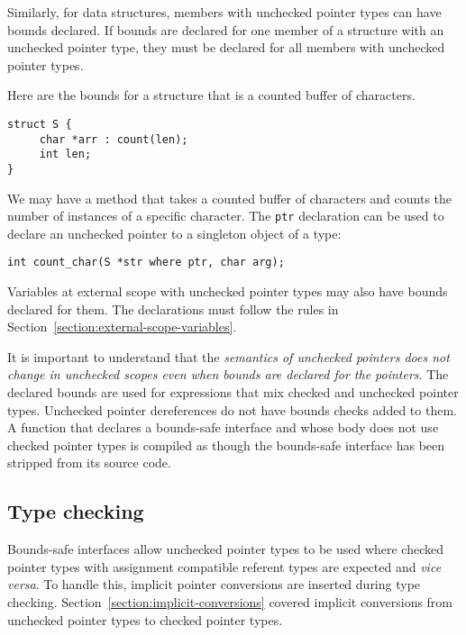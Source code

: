 Similarly, for data structures, members with unchecked pointer types can
have bounds declared. If bounds are declared for one member of a
structure with an unchecked pointer type, they must be declared for all
members with unchecked pointer types.

Here are the bounds for a structure that is a counted buffer of
characters.
\begin{verbatim}
struct S {
     char *arr : count(len);
     int len;
}
\end{verbatim}

We may have a method that takes a counted buffer of characters and
counts the number of instances of a specific character. The \texttt{ptr}
declaration can be used to declare an unchecked pointer to a singleton
object of a type:
\begin{verbatim}
int count_char(S *str where ptr, char arg);
\end{verbatim}

Variables at external scope with unchecked pointer types may also have
bounds declared for them.   The declarations must follow the 
rules in Section~\ref{section:external-scope-variables}.

It is important to understand that the \emph{semantics of unchecked
pointers does not change in unchecked scopes even when bounds are
declared for the pointers}. The declared bounds are used  for expressions
that mix checked and unchecked pointer types. Unchecked pointer dereferences do not
have bounds checks added to them. A function that declares a bounds-safe 
interface and whose body does not use checked pointer
types is compiled as though the bounds-safe interface has been
stripped from its source code.

\subsection{Type checking}

Bounds-safe interfaces allow unchecked pointer types to be used
where checked pointer types with assignment compatible referent types are
expected and {\it vice versa}.
To handle this, implicit pointer conversions are inserted during type checking.
Section~\ref{section:implicit-conversions} covered implicit conversions from unchecked pointer types to checked pointer types.

